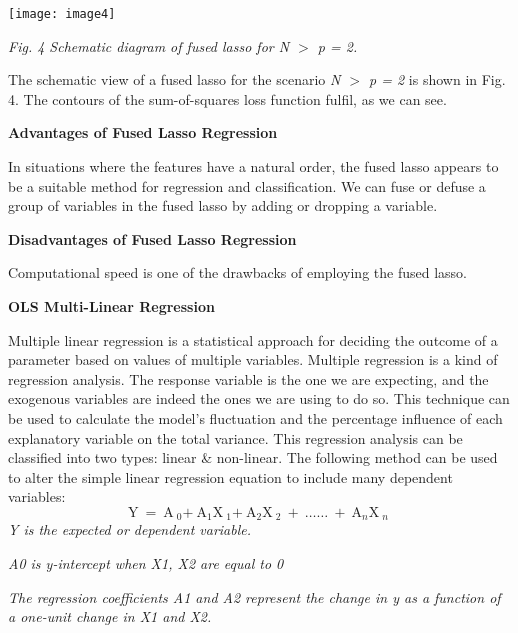 \documentclass{article} %
\begin{document}
\noindent \texttt{[image: image4]}

\noindent \textit{Fig. 4 Schematic diagram of fused lasso for N $>$ p = 2.}

\noindent The schematic view of a fused lasso for the scenario \textit{N $>$ p = 2} is shown in Fig. 4. The contours of the sum-of-squares loss function fulfil, as we can see.

\noindent \textbf{Advantages of Fused Lasso Regression}

\noindent In situations where the features have a natural order, the fused lasso appears to be a suitable method for regression and classification. We can fuse or defuse a group of variables in the fused lasso by adding or dropping a variable.

\noindent \textbf{Disadvantages of Fused Lasso Regression}

\noindent Computational speed is one of the drawbacks of employing the fused lasso.

\noindent 

\noindent 

\noindent 

\noindent \textbf{OLS Multi-Linear Regression}

\noindent Multiple linear regression is a statistical approach for deciding the outcome of a parameter based on values of multiple variables. Multiple regression is a kind of regression analysis. The response variable is the one we are expecting, and the exogenous variables are indeed the ones we are using to do so. This technique can be used to calculate the model's fluctuation and the percentage influence of each explanatory variable on the total variance. This regression analysis can be classified into two types: linear \& non-linear. The following method can be used to alter the simple linear regression equation to include many dependent variables:
\begin{equation} \label{GrindEQ__12_} 
\mathrm{Y\ =\ }{\mathrm{A\ }}_0\mathrm{+\ }{\mathrm{A}}_1{\mathrm{X\ }}_1\mathrm{+\ }{\mathrm{A}}_2{\mathrm{X\ }}_2\mathrm{\ +\ \dots \dots \ +\ }{\mathrm{A}}_n{\mathrm{X\ }}_n\mathrm{\ } 
\end{equation} 
\textit{Y is the expected or dependent variable.}

\noindent \textit{A0 is y-intercept when X1, X2 are equal to 0}

\noindent \textit{The regression coefficients A1 and A2 represent the change in y as a function of a one-unit change in X1 and X2.}
\end{document}
